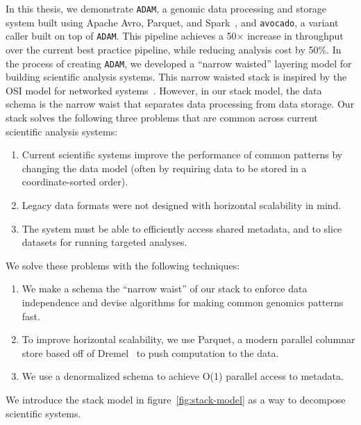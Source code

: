 \documentclass[masters]{ucbthesis}
\begin{document}
In this thesis, we demonstrate \texttt{ADAM}, a genomic data processing and storage system built using
Apache Avro, Parquet, and Spark~\cite{avro, parquet, zaharia10}, and \texttt{avocado}, a variant caller
built on top of \texttt{ADAM}. This pipeline achieves a 50$\times$ increase in throughput over the current
best practice pipeline, while reducing analysis cost by 50\%. In the process of creating \texttt{ADAM},
we developed a ``narrow waisted'' layering model for building scientific analysis systems. This narrow
waisted stack is inspired by the OSI model for networked systems~\cite{zimmermann80}. However, in our
stack model, the data schema is the narrow waist that separates data processing from data storage. Our
stack solves the following three problems that are common across current scientific analysis systems:

\begin{enumerate}
\item Current scientific systems improve the performance of common patterns by changing the data
model (often by requiring data to be stored in a coordinate-sorted order).
\item Legacy data formats were not designed with horizontal scalability in mind.
\item The system must be able to efficiently access shared metadata, and to slice datasets for running
targeted analyses.
\end{enumerate}

We solve these problems with the following techniques:

\begin{enumerate}
\item We make a schema the ``narrow waist'' of our stack to enforce data independence and
devise algorithms for making common genomics patterns fast.
\item To improve horizontal scalability, we use Parquet, a modern parallel columnar store based off of
Dremel~\cite{melnik10} to push computation to the data.
\item We use a denormalized schema to achieve O(1) parallel access to metadata.
\end{enumerate}

We introduce the stack model in figure~\ref{fig:stack-model} as a way to decompose scientific systems.
\end{document}
